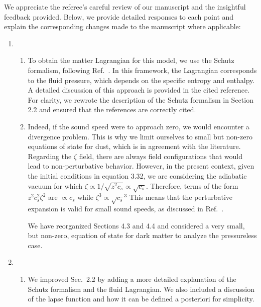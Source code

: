 \documentclass[a4paper,11pt]{article}
\begin{document}
We appreciate the referee’s careful review of our manuscript and the insightful feedback
provided. Below, we provide detailed responses to each point and explain the
corresponding changes made to the manuscript where applicable:

\begin{enumerate}
    \item
          \begin{enumerate}
              \item  To obtain the matter Lagrangian for this model, we use the Schutz
                    formalism, following Ref.~\cite{fluidgeral}. In this framework, the
                    Lagrangian corresponds to the fluid pressure, which depends on the
                    specific entropy and enthalpy. A detailed discussion of this
                    approach is provided in the cited reference. For clarity, we rewrote
                    the description of the Schutz formalism in Section 2.2 and ensured
                    that the references are correctly cited.

              \item Indeed, if the sound speed were to approach zero, we would encounter
                    a divergence problem. This is why we limit ourselves to small but
                    non-zero equations of state for dust, which is in agreement with the
                    literature. Regarding the $\zeta$ field, there are always field
                    configurations that would lead to non-perturbative behavior.
                    However, in the present context, given the initial conditions in
                    equation 3.32, we are considering the adiabatic vacuum for which
                    $\zeta \propto 1/\sqrt{z^2c_s} \propto \sqrt{c_s}$. Therefore, terms
                    of the form $z^2c_s^2\zeta^2$ are $\propto c_s$ while $\zeta^3
                        \propto \sqrt{c_s}^3$ This means that the perturbative expansion is valid
                    for small sound speeds, as discussed in
                    Ref.~\cite{vitenti2012large}.

                    We have reorganized Sections 4.3 and 4.4 and considered a very
                    small, but non-zero, equation of state for dark matter to analyze
                    the pressureless case.
          \end{enumerate}

    \item

          \begin{enumerate}
              \item We improved Sec.~2.2 by adding a more detailed explanation of the
                    Schutz formalism and the fluid Lagrangian. We also included a
                    discussion of the lapse function and how it can be defined a
                    posteriori for simplicity.


\end{enumerate}
\end{enumerate}
\end{document}
